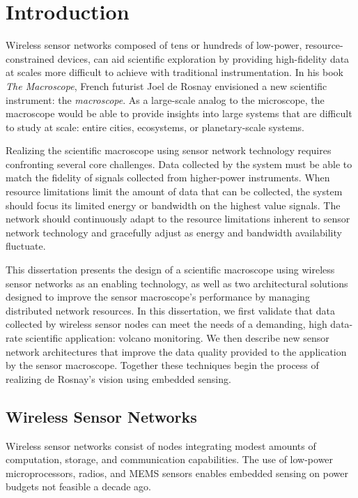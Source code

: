 \chapter{Introduction}
\label{chap-introduction}

Wireless sensor networks composed of tens or hundreds of low-power,
resource-constrained devices, can aid scientific exploration by providing
high-fidelity data at scales more difficult to achieve with traditional
instrumentation. In his book \textit{The Macroscope}, French futurist Joel de
Rosnay envisioned a new scientific instrument: the \textit{macroscope}. As a
large-scale analog to the microscope, the macroscope would be able to provide
insights into large systems that are difficult to study at scale: entire
cities, ecosystems, or planetary-scale systems.

Realizing the scientific macroscope using sensor network technology requires
confronting several core challenges. Data collected by the system must be
able to match the fidelity of signals collected from higher-power
instruments. When resource limitations limit the amount of data that can be
collected, the system should focus its limited energy or bandwidth on the
highest value signals. The network should continuously adapt to the resource
limitations inherent to sensor network technology and gracefully adjust as
energy and bandwidth availability fluctuate.

This dissertation presents the design of a scientific macroscope using
wireless sensor networks as an enabling technology, as well as two
architectural solutions designed to improve the sensor macroscope's
performance by managing distributed network resources. In this dissertation,
we first validate that data collected by wireless sensor nodes can meet the
needs of a demanding, high data-rate scientific application: volcano
monitoring. We then describe new sensor network architectures that improve
the data quality provided to the application by the sensor macroscope.
Together these techniques begin the process of realizing de Rosnay's vision
using embedded sensing.

\section{Wireless Sensor Networks}

Wireless sensor networks consist of nodes integrating modest amounts of
computation, storage, and communication capabilities. The use of low-power
microprocessors, radios, and MEMS sensors enables embedded sensing on power
budgets not feasible a decade ago.


